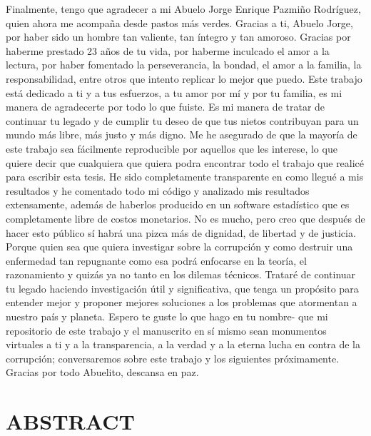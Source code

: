 \documentclass[floatsintext,man]{apa7}\usepackage[]{graphicx}\usepackage[]{color}
\begin{document}
Finalmente, tengo que agradecer a mi Abuelo Jorge Enrique Pazmiño Rodríguez, quien ahora me acompaña desde pastos más verdes. Gracias a ti, Abuelo Jorge, por haber sido un hombre tan valiente, tan íntegro y tan amoroso. Gracias por haberme prestado 23 años de tu vida, por haberme inculcado el amor a la lectura, por haber fomentado la perseverancia, la bondad, el amor a la familia, la responsabilidad, entre otros que intento replicar lo mejor que puedo. Este trabajo está dedicado a ti y a tus esfuerzos, a tu amor por mí y por tu familia, es mi manera de agradecerte por todo lo que fuiste. Es mi manera de tratar de continuar tu legado y de cumplir tu deseo de que tus nietos contribuyan para un mundo más libre, más justo y más digno. Me he asegurado de que la mayoría de este trabajo sea fácilmente reproducible por aquellos que les interese, lo que quiere decir que cualquiera que quiera podra encontrar todo el trabajo que realicé para escribir esta tesis. He sido completamente transparente en como llegué a mis resultados y he comentado todo mi código y analizado mis resultados extensamente, además de haberlos producido en un software estadístico que es completamente libre de costos monetarios. No es mucho, pero creo que después de hacer esto público sí habrá una pizca más de dignidad, de libertad y de justicia. Porque quien sea que quiera investigar sobre la corrupción y como destruir una enfermedad tan repugnante como esa podrá enfocarse en la teoría, el razonamiento y quizás ya no tanto en los dilemas técnicos. Trataré de continuar tu legado haciendo investigación útil y significativa, que tenga un propósito para entender mejor y proponer mejores soluciones a los problemas que atormentan a nuestro país y planeta. Espero te guste lo que hago en tu nombre- que mi repositorio de este trabajo y el manuscrito en sí mismo sean monumentos virtuales a ti y a la transparencia, a la verdad y a la eterna lucha en contra de la corrupción; conversaremos sobre este trabajo y los siguientes próximamente. Gracias por todo Abuelito, descansa en paz. 

\clearpage


\section*{ABSTRACT}
\end{document}
